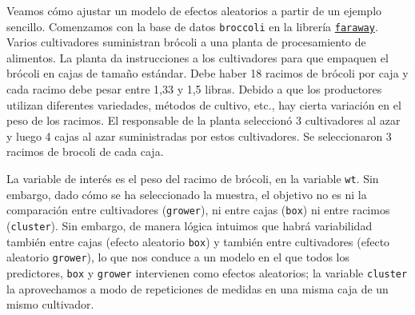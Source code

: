 \documentclass[
]{book}
\newenvironment{Shaded}{\begin{snugshade}}{\end{snugshade}}
\newcommand{\CommentTok}[1]{\textcolor[rgb]{0.56,0.35,0.01}{\textit{#1}}}
\newcommand{\FunctionTok}[1]{\textcolor[rgb]{0.00,0.00,0.00}{#1}}
\newcommand{\NormalTok}[1]{#1}
\newcommand{\SpecialCharTok}[1]{\textcolor[rgb]{0.00,0.00,0.00}{#1}}
\begin{document}
\begin{Shaded}
\end{Shaded}

Veamos cómo ajustar un modelo de efectos aleatorios a partir de un ejemplo sencillo. Comenzamos con la base de datos \texttt{broccoli} en la librería \href{https://cran.r-project.org/web/packages/faraway/faraway.pdf}{\texttt{faraway}}. Varios cultivadores suministran brócoli a una planta de procesamiento de alimentos. La planta da instrucciones a los cultivadores para que empaquen el brócoli en cajas de tamaño estándar. Debe haber 18 racimos de brócoli por caja y cada racimo debe pesar entre 1,33 y 1,5 libras. Debido a que los productores utilizan diferentes variedades, métodos de cultivo, etc., hay cierta variación en el peso de los racimos. El responsable de la planta seleccionó 3 cultivadores al azar y luego 4 cajas al azar suministradas por estos cultivadores. Se seleccionaron 3 racimos de brocoli de cada caja.

La variable de interés es el peso del racimo de brócoli, en la variable \texttt{wt}. Sin embargo, dado cómo se ha seleccionado la muestra, el objetivo no es ni la comparación entre cultivadores (\texttt{grower}), ni entre cajas (\texttt{box}) ni entre racimos (\texttt{cluster}). Sin embargo, de manera lógica intuimos que habrá variabilidad también entre cajas (efecto aleatorio \texttt{box}) y también entre cultivadores (efecto aleatorio \texttt{grower}), lo que nos conduce a un modelo en el que todos los predictores, \texttt{box} y \texttt{grower} intervienen como efectos aleatorios; la variable \texttt{cluster} la aprovechamos a modo de repeticiones de medidas en una misma caja de un mismo cultivador.
\end{document}
